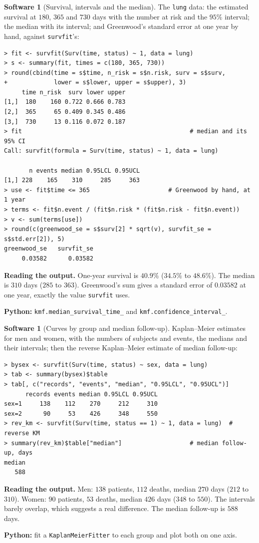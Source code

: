 \documentclass[11pt,a4paper]{article}
\numberwithin{equation}{section}
\theoremstyle{definition}
\newtheorem{software}[thm]{Software}
\begin{document}
\begin{software}[Survival, intervals and the median]
\label{sw:kmlung}
The \texttt{lung} data: the estimated survival at $180$, $365$ and $730$ days with the number at risk and the $95\%$ interval; the median with its interval; and Greenwood's standard error at one year by hand, against \texttt{survfit}'s:
{\small\begin{verbatim}
> fit <- survfit(Surv(time, status) ~ 1, data = lung)
> s <- summary(fit, times = c(180, 365, 730))
> round(cbind(time = s$time, n_risk = s$n.risk, surv = s$surv,
+             lower = s$lower, upper = s$upper), 3)
     time n_risk  surv lower upper
[1,]  180    160 0.722 0.666 0.783
[2,]  365     65 0.409 0.345 0.486
[3,]  730     13 0.116 0.072 0.187
> fit                                               # median and its 95% CI
Call: survfit(formula = Surv(time, status) ~ 1, data = lung)

       n events median 0.95LCL 0.95UCL
[1,] 228    165    310     285     363
> use <- fit$time <= 365                      # Greenwood by hand, at 1 year
> terms <- fit$n.event / (fit$n.risk * (fit$n.risk - fit$n.event))
> v <- sum(terms[use])
> round(c(greenwood_se = s$surv[2] * sqrt(v), survfit_se = s$std.err[2]), 5)
greenwood_se   survfit_se 
     0.03582      0.03582 
\end{verbatim}}
\textbf{Reading the output.} One-year survival is $40.9\%$ ($34.5\%$ to $48.6\%$). The median is $310$ days ($285$ to $363$). Greenwood's sum gives a standard error of $0.03582$ at one year, exactly the value \texttt{survfit} uses.

\textbf{Python:} \texttt{kmf.median\_survival\_time\_} and \texttt{kmf.confidence\_interval\_}.
\end{software}

\begin{software}[Curves by group and median follow-up]
\label{sw:kmsex}
Kaplan--Meier estimates for men and women, with the numbers of subjects and events, the medians and their intervals; then the reverse Kaplan--Meier estimate of median follow-up:
{\small\begin{verbatim}
> bysex <- survfit(Surv(time, status) ~ sex, data = lung)
> tab <- summary(bysex)$table
> tab[, c("records", "events", "median", "0.95LCL", "0.95UCL")]
      records events median 0.95LCL 0.95UCL
sex=1     138    112    270     212     310
sex=2      90     53    426     348     550
> rev_km <- survfit(Surv(time, status == 1) ~ 1, data = lung)  # reverse KM
> summary(rev_km)$table["median"]                   # median follow-up, days
median 
   588 
\end{verbatim}}
\textbf{Reading the output.} Men: $138$ patients, $112$ deaths, median $270$ days ($212$ to $310$). Women: $90$ patients, $53$ deaths, median $426$ days ($348$ to $550$). The intervals barely overlap, which suggests a real difference. The median follow-up is $588$ days.

\textbf{Python:} fit a \texttt{KaplanMeierFitter} to each group and plot both on one axis.
\end{software}
\end{document}

